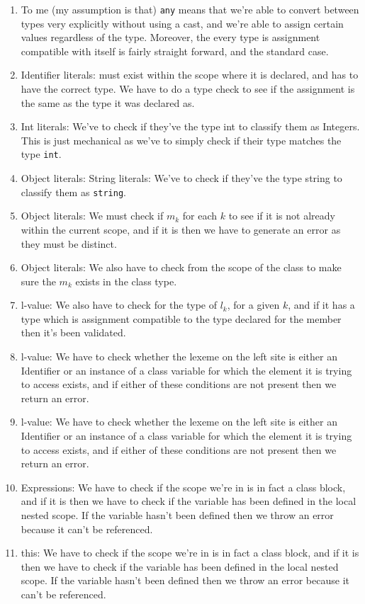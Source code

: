 \documentclass[11pt, oneside]{article}
\begin{document}
\begin{enumerate}
\item To me (my assumption is that) \texttt{any} means that we're able to convert between types very explicitly without using a cast, and we're able to assign certain values regardless of the type. Moreover, the every type is assignment compatible with itself is fairly straight forward, and the standard case. 
\item Identifier literals: must exist within the scope where it is declared, and has to have the correct type. We have to do a type check to see if the assignment is the same as the type it was declared as.
\item Int literals: We've to check if they've the type int to classify them as Integers. This is just mechanical as we've to simply check if their type matches the type \texttt{int}.
\item Object literals: String literals: We've to check if they've the type string to classify them as  \texttt{string}.
\item Object literals: We must check if $m_k$ for each $k$ to see if it is not already within the current scope, and if it is then we have to generate an error as they must be distinct.
\item Object literals: We also have to check from the scope of the class to make sure the $m_k$ exists in the class type.
\item l-value: We also have to check for the type of $l_k$, for a given $k$, and if it has a type which is assignment compatible to the type declared for the member then it's been validated.
\item l-value: We have to check whether the lexeme on the left site is either an Identifier or an instance of a class variable for which the element it is trying to access exists, and if either of these conditions are not present then we return an error.
\item l-value: We have to check whether the lexeme on the left site is either an Identifier or an instance of a class variable for which the element it is trying to access exists, and if either of these conditions are not present then we return an error.
\item Expressions: We have to check if the scope we're in is in fact a class block, and if it is then we have to check if the variable has been defined in the local nested scope. If the variable hasn't been defined then we throw an error because it can't be referenced.
\item this: We have to check if the scope we're in is in fact a class block, and if it is then we have to check if the variable has been defined in the local nested scope. If the variable hasn't been defined then we throw an error because it can't be referenced.
\end{enumerate}
\end{document}
